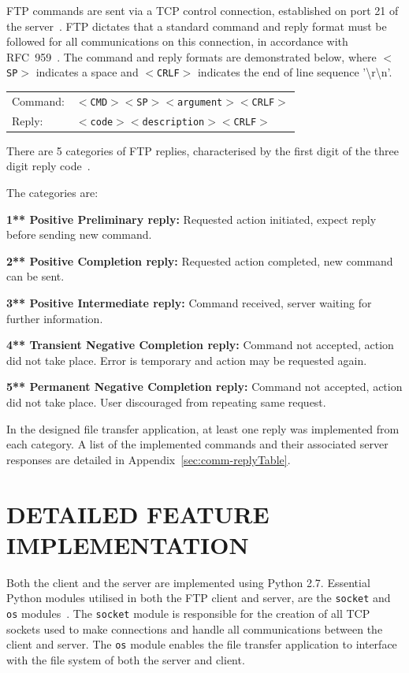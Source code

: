 \documentclass[10pt,twocolumn]{witseiepaper}
\begin{document}
FTP commands are sent via a TCP control connection, established on port 21 of the server~\cite{topDownApproach6th}. FTP dictates that a standard command and reply format must be followed for all communications on this connection, in accordance with RFC~959~\cite{rfc959}. The command and reply formats are demonstrated below, where \texttt{$<$SP$>$} indicates a space and \texttt{$<$CRLF$>$} indicates the end of line sequence '\textbackslash r\textbackslash n'.

\begin{tabular}{ll}
	Command:& \texttt{$<$CMD$>$$<$SP$>$$<$argument$>$$<$CRLF$>$} \\[5pt]
	Reply:& \texttt{$<$code$>$$<$description$>$$<$CRLF$>$} \\[5pt]
\end{tabular} 

There are 5 categories of FTP replies, characterised by the first digit of the three digit reply code~\cite{rfc959}. 

The categories are: 

\textbf{1**	Positive Preliminary reply:} 
Requested action initiated, expect reply before sending new command.

\textbf{2**	Positive Completion reply:} 
Requested action completed, new command can be sent.

\textbf{3**   Positive Intermediate reply:} 
Command received, server waiting for further information.

\textbf{4**   Transient Negative Completion reply:} 
Command not accepted, action did not take place. Error is temporary and action may be requested again.

\textbf{5**   Permanent Negative Completion reply:} 
Command not accepted, action did not take place. User discouraged from repeating same request.

In the designed file transfer application, at least one reply was implemented from each category. A list of the implemented commands and their associated server responses are detailed in Appendix~\ref{sec:comm-replyTable}.

\section{DETAILED FEATURE IMPLEMENTATION} %

Both the client and the server are implemented using Python 2.7. Essential Python modules utilised in both the FTP client and server, are the \texttt{socket} and \texttt{os} modules~\cite{osModule,socketModule}. The \texttt{socket} module is responsible for the creation of all TCP sockets used to make connections and handle all communications between the client and server. The \texttt{os} module enables the file transfer application to interface with the file system of both the server and client.
\end{document}
